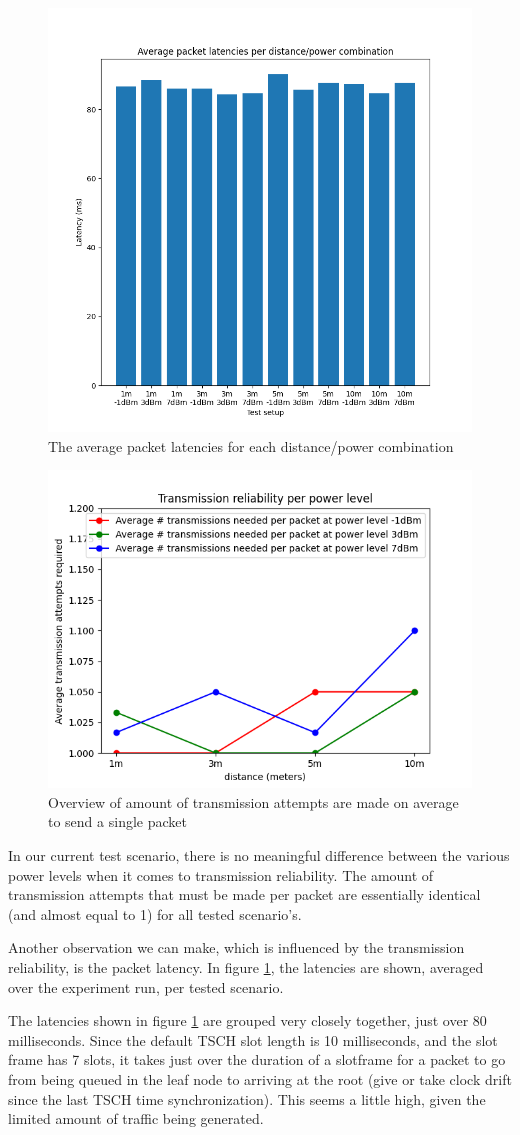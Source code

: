 \documentclass[conference]{IEEEtran}
\begin{document}
\begin{figure}[]
	\centering
	\includegraphics[width=.5\textwidth,keepaspectratio]{average_latencies.png}
	\caption{The average packet latencies for each distance/power combination}
	\label{fig:averagelatencies}
\end{figure}
\begin{figure}[]
	\centering
	\includegraphics[width=.5\textwidth,keepaspectratio]{transmission_reliability.png}
	\caption{Overview of amount of transmission attempts are made on average to send a single packet}
	\label{fig:txattempts}
\end{figure}

In our current test scenario, there is no meaningful difference between the various power levels when it comes to transmission reliability. The amount of transmission attempts that must be made per packet are essentially identical (and almost equal to 1) for all tested scenario's. 

Another observation we can make, which is influenced by the transmission reliability, is the packet latency. In figure \ref{fig:averagelatencies}, the latencies are shown, averaged over the experiment run, per tested scenario. 

The latencies shown in figure \ref{fig:averagelatencies} are grouped very closely together, just over 80 milliseconds. Since the default TSCH slot length is 10 milliseconds, and the slot frame has 7 slots, it takes just over the duration of a slotframe for a packet to go from being queued in the leaf node to arriving at the root (give or take clock drift since the last TSCH time synchronization). This seems a little high, given the limited amount of traffic being generated. 
\end{document}
